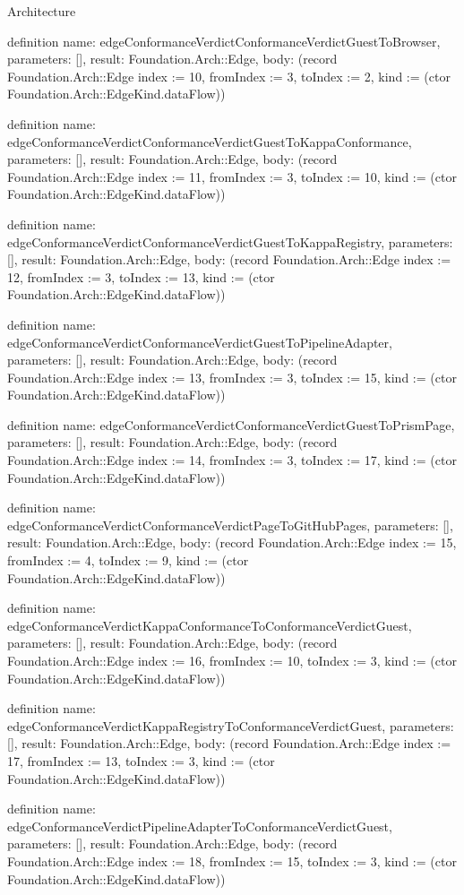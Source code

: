 \begin{lexlean}{Architecture}
\begin{semanticmodule}
definition{
  name: edgeConformanceVerdictConformanceVerdictGuestToBrowser,
  parameters: [],
  result: Foundation.Arch::Edge,
  body: (record Foundation.Arch::Edge {index := 10, fromIndex := 3, toIndex := 2, kind := (ctor Foundation.Arch::EdgeKind.dataFlow)})
}

definition{
  name: edgeConformanceVerdictConformanceVerdictGuestToKappaConformance,
  parameters: [],
  result: Foundation.Arch::Edge,
  body: (record Foundation.Arch::Edge {index := 11, fromIndex := 3, toIndex := 10, kind := (ctor Foundation.Arch::EdgeKind.dataFlow)})
}

definition{
  name: edgeConformanceVerdictConformanceVerdictGuestToKappaRegistry,
  parameters: [],
  result: Foundation.Arch::Edge,
  body: (record Foundation.Arch::Edge {index := 12, fromIndex := 3, toIndex := 13, kind := (ctor Foundation.Arch::EdgeKind.dataFlow)})
}

definition{
  name: edgeConformanceVerdictConformanceVerdictGuestToPipelineAdapter,
  parameters: [],
  result: Foundation.Arch::Edge,
  body: (record Foundation.Arch::Edge {index := 13, fromIndex := 3, toIndex := 15, kind := (ctor Foundation.Arch::EdgeKind.dataFlow)})
}

definition{
  name: edgeConformanceVerdictConformanceVerdictGuestToPrismPage,
  parameters: [],
  result: Foundation.Arch::Edge,
  body: (record Foundation.Arch::Edge {index := 14, fromIndex := 3, toIndex := 17, kind := (ctor Foundation.Arch::EdgeKind.dataFlow)})
}

definition{
  name: edgeConformanceVerdictConformanceVerdictPageToGitHubPages,
  parameters: [],
  result: Foundation.Arch::Edge,
  body: (record Foundation.Arch::Edge {index := 15, fromIndex := 4, toIndex := 9, kind := (ctor Foundation.Arch::EdgeKind.dataFlow)})
}

definition{
  name: edgeConformanceVerdictKappaConformanceToConformanceVerdictGuest,
  parameters: [],
  result: Foundation.Arch::Edge,
  body: (record Foundation.Arch::Edge {index := 16, fromIndex := 10, toIndex := 3, kind := (ctor Foundation.Arch::EdgeKind.dataFlow)})
}

definition{
  name: edgeConformanceVerdictKappaRegistryToConformanceVerdictGuest,
  parameters: [],
  result: Foundation.Arch::Edge,
  body: (record Foundation.Arch::Edge {index := 17, fromIndex := 13, toIndex := 3, kind := (ctor Foundation.Arch::EdgeKind.dataFlow)})
}

definition{
  name: edgeConformanceVerdictPipelineAdapterToConformanceVerdictGuest,
  parameters: [],
  result: Foundation.Arch::Edge,
  body: (record Foundation.Arch::Edge {index := 18, fromIndex := 15, toIndex := 3, kind := (ctor Foundation.Arch::EdgeKind.dataFlow)})
}


\end{semanticmodule}
\end{lexlean}
